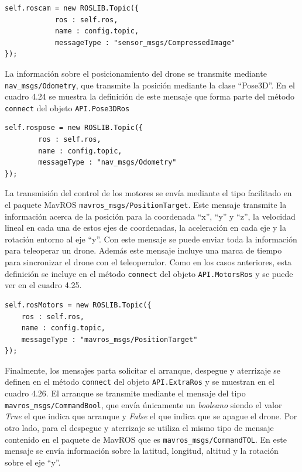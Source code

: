 \begin{lstlisting}[caption= Definición del mensaje para la información de las cámaras, label=cod.mensajecamdrone]
self.roscam = new ROSLIB.Topic({
            ros : self.ros,
            name : config.topic,
            messageType : "sensor_msgs/CompressedImage"
});
\end{lstlisting}

La información sobre el posicionamiento del drone se transmite mediante \texttt{nav\_msgs/Odometry}, que transmite la posición mediante la clase ``Pose3D''. En el cuadro 4.24 se muestra la definición de este mensaje que forma parte del método \texttt{connect} del objeto \texttt{API.Pose3DRos}

\begin{lstlisting}[caption= Definición del mensaje para obtener el posicionamiento del drone, label=cod.mensajeposedrone]
self.rospose = new ROSLIB.Topic({
		ros : self.ros,
		name : config.topic,
		messageType : "nav_msgs/Odometry"
});
\end{lstlisting}

La transmisión del control de los motores se envía mediante el tipo facilitado en el paquete MavROS \texttt{mavros\_msgs/PositionTarget}. Este mensaje transmite la información acerca de la posición para la coordenada ``x'', ``y'' y ``z'', la velocidad lineal en cada una de estos ejes de coordenadas, la aceleración en cada eje y la rotación entorno al eje ``y''. Con este mensaje se puede enviar toda la información para teleoperar un drone. Además este mensaje incluye una marca de tiempo para sincronizar el drone con el teleoperador. Como en los casos anteriores, esta definición se incluye en el método \texttt{connect} del objeto \texttt{API.MotorsRos} y se puede ver en el cuadro 4.25.

\begin{lstlisting}[caption= Definición del mensaje para controlar los motores del drone, label=cod.mensajemotordrone]
self.rosMotors = new ROSLIB.Topic({
	ros : self.ros,
	name : config.topic,
	messageType : "mavros_msgs/PositionTarget"
});
\end{lstlisting}

Finalmente, los mensajes parta solicitar el arranque, despegue y aterrizaje se definen en el método \texttt{connect} del objeto \texttt{API.ExtraRos} y se muestran en el cuadro 4.26. El arranque se transmite mediante el mensaje del tipo \texttt{mavros\_msgs/CommandBool}, que envía únicamente un \textit{booleano} siendo el valor \textit{True} el que indica que arranque y \textit{False} el que indica que se apague el drone. Por otro lado, para el despegue y aterrizaje se utiliza el mismo tipo de mensaje contenido en el paquete de MavROS que es \texttt{mavros\_msgs/CommandTOL}. En este mensaje se envía información sobre la latitud, longitud, altitud y la rotación sobre el eje ``y''.

